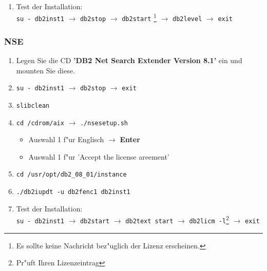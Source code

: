 \begin{enumerate}
\begin{itemize}
\item Administrator contact : Standart beibehalten $\rightarrow$ {\bf Next} \footnote{Warnung ignorieren}
\item Contact : Standart beibehalten ({\bf db2inst1}) $\rightarrow$ {\bf Next}
\item Summary $\rightarrow$ {\bf Finish}
\item Warten (dauert etwas)
\item Setup complete $\rightarrow$ {\bf Finish}
\end{itemize}
\item Test der Installation:\\
{\tt su - db2inst1} $\rightarrow$ {\tt db2stop} $\rightarrow$ {\tt db2start} \footnote{Es sollte keine Nachricht bez"uglich der Lizenz erscheinen.} $\rightarrow$ {\tt db2level} $\rightarrow$ {\tt exit}
\end{enumerate}
%
\subsubsection{NSE}
\begin{enumerate}
\item Legen Sie die CD {\bf 'DB2 Net Search Extender Version 8.1'} ein und mounten Sie diese.
\item {\tt su - db2inst1} $\rightarrow$ {\tt db2stop} $\rightarrow$ {\tt exit}
\item {\tt slibclean}
\item {\tt cd /cdrom/aix} $\rightarrow$ {\tt ./nsesetup.sh}
\begin{itemize}
\item Auswahl 1 f"ur Englisch $\rightarrow$ {\bf Enter}
\item Auswahl 1 f"ur 'Accept the license areement'
\end{itemize}
\item {\tt cd /usr/opt/db2\_08\_01/instance}
\item {\tt ./db2iupdt -u db2fenc1 db2inst1}
\item Test der Installation:\\
{\tt su - db2inst1} $\rightarrow$ {\tt db2start} $\rightarrow$ {\tt db2text start} $\rightarrow$ {\tt db2licm -l}\footnote{Pr"uft Ihren Lizenzeintrag} $\rightarrow$ {\tt exit}
\end{enumerate}
%
